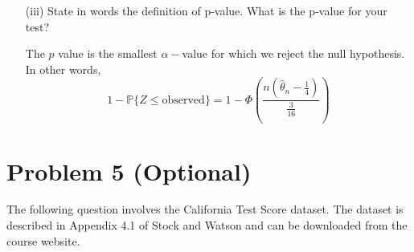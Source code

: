 \documentclass[11pt]{article}
\newcommand{\bbP}{\mathbb{P}}
\begin{document}
\begin{enumerate}
\begin{itemize}
\begin{solution}
    \end{solution}
        \item[(iii)] State in words the definition of p-value. What is the p-value for your test?
        \begin{solution}
            The $p$ value is the smallest $\alpha-$value for which we reject the null hypothesis. In other words, 
        \[1-\bbP\{Z \leq \text{observed}\}= 1-\Phi(\frac{n(\hat{\theta}_n - \frac{1}{4})}{\frac{3}{16}})\]
        \end{solution}
    \end{itemize}
\end{enumerate}

\newpage
\section*{Problem 5 (Optional)}
The following question involves the California Test Score dataset. The dataset is described in Appendix 4.1 of Stock and Watson and can be downloaded from the course website.
\end{document}

